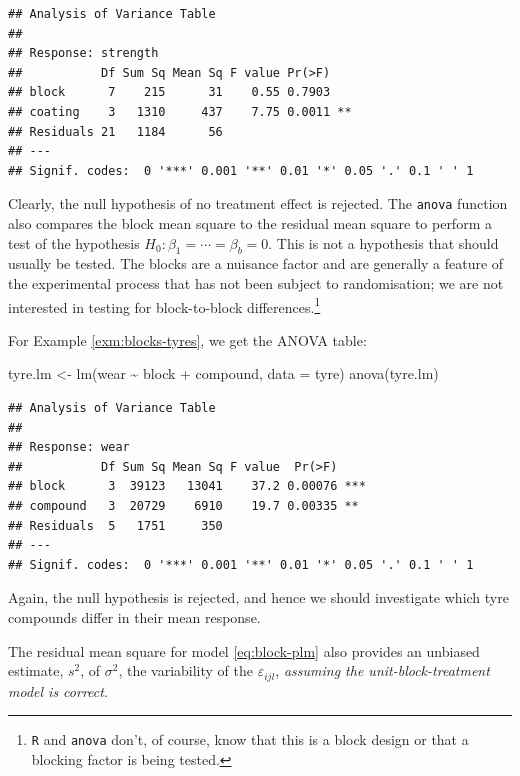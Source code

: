 \documentclass[
]{book}
\newenvironment{Shaded}{\begin{snugshade}}{\end{snugshade}}
\newcommand{\AttributeTok}[1]{\textcolor[rgb]{0.77,0.63,0.00}{#1}}
\newcommand{\FunctionTok}[1]{\textcolor[rgb]{0.00,0.00,0.00}{#1}}
\newcommand{\NormalTok}[1]{#1}
\newcommand{\OtherTok}[1]{\textcolor[rgb]{0.56,0.35,0.01}{#1}}
\newcommand{\SpecialCharTok}[1]{\textcolor[rgb]{0.00,0.00,0.00}{#1}}
\theoremstyle{definition}
\theoremstyle{definition}
\theoremstyle{definition}
\theoremstyle{definition}
\theoremstyle{remark}
\begin{document}
\begin{verbatim}
## Analysis of Variance Table
## 
## Response: strength
##           Df Sum Sq Mean Sq F value Pr(>F)   
## block      7    215      31    0.55 0.7903   
## coating    3   1310     437    7.75 0.0011 **
## Residuals 21   1184      56                  
## ---
## Signif. codes:  0 '***' 0.001 '**' 0.01 '*' 0.05 '.' 0.1 ' ' 1
\end{verbatim}

Clearly, the null hypothesis of no treatment effect is rejected. The \texttt{anova} function also compares the block mean square to the residual mean square to perform a test of the hypothesis \(H_0: \beta_1 = \cdots = \beta_b = 0\). This is not a hypothesis that should usually be tested. The blocks are a nuisance factor and are generally a feature of the experimental process that has not been subject to randomisation; we are not interested in testing for block-to-block differences.\footnote{\texttt{R} and \texttt{anova} don't, of course, know that this is a block design or that a blocking factor is being tested.}

For Example \ref{exm:blocks-tyres}, we get the ANOVA table:

\begin{Shaded}
\begin{Highlighting}[]
\NormalTok{tyre.lm }\OtherTok{\textless{}{-}} \FunctionTok{lm}\NormalTok{(wear }\SpecialCharTok{\textasciitilde{}}\NormalTok{ block }\SpecialCharTok{+}\NormalTok{ compound, }\AttributeTok{data =}\NormalTok{ tyre)}
\FunctionTok{anova}\NormalTok{(tyre.lm)}
\end{Highlighting}
\end{Shaded}

\begin{verbatim}
## Analysis of Variance Table
## 
## Response: wear
##           Df Sum Sq Mean Sq F value  Pr(>F)    
## block      3  39123   13041    37.2 0.00076 ***
## compound   3  20729    6910    19.7 0.00335 ** 
## Residuals  5   1751     350                    
## ---
## Signif. codes:  0 '***' 0.001 '**' 0.01 '*' 0.05 '.' 0.1 ' ' 1
\end{verbatim}

Again, the null hypothesis is rejected, and hence we should investigate which tyre compounds differ in their mean response.

The residual mean square for model \eqref{eq:block-plm} also provides an unbiased estimate, \(s^2\), of \(\sigma^2\), the variability of the \(\varepsilon_{ijl}\), \emph{assuming the unit-block-treatment model is correct}.
\end{document}
